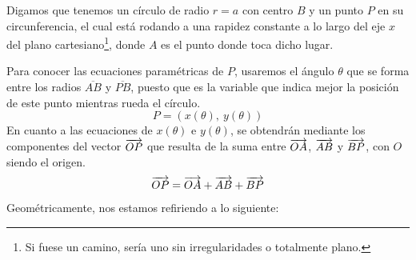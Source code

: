 \documentclass[12pt]{article}
\begin{document}
Digamos que tenemos un círculo de radio $r = a$ con centro $B$ y un punto $P$ en su circunferencia, el cual está rodando a una rapidez constante a lo largo del eje $x$ del plano cartesiano\footnote{Si fuese un camino, sería uno sin irregularidades o totalmente plano.}, donde $A$ es el punto donde toca dicho lugar.

\newpage

\begin{figure}[hbt!]
\centering


\end{figure}

Para conocer las ecuaciones paramétricas de $P$, usaremos el ángulo $\theta$ que se forma entre los radios $\overline{AB}$ y $\overline{PB}$, puesto que es la variable que indica mejor la posición de este punto mientras rueda el círculo.
\[
  P = (x(\theta), \ y(\theta))
\]
En cuanto a las ecuaciones de $x(\theta)$ e $y(\theta)$, se obtendrán mediante los componentes del vector $\overrightarrow{OP}$ que resulta de la suma entre $\overrightarrow{OA}$, $\overrightarrow{AB}$ y $\overrightarrow{BP}$, con $O$ siendo el origen.
\[
  \overrightarrow{OP} = \overrightarrow{OA} + \overrightarrow{AB} + \overrightarrow{BP}
\]
Geométricamente, nos estamos refiriendo a lo siguiente:
\end{document}
